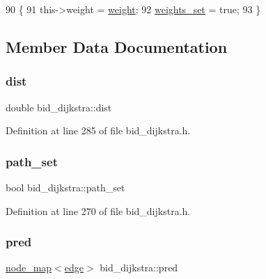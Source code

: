 \begin{DoxyCode}
90 \{
91     this->weight = \mbox{\hyperlink{classbid__dijkstra_a477c4f7ce631df84c832cb7d517cd243}{weight}};
92     \mbox{\hyperlink{classbid__dijkstra_a7636f90a27d14c9eb4b115e8dad05464}{weights\_set}} = \textcolor{keyword}{true};
93 \}
\end{DoxyCode}


\subsection{Member Data Documentation}
\mbox{\label{classbid__dijkstra_a10224bf2b56cb3fe20cef83592ecdc13}} 
\subsubsection{\texorpdfstring{dist}{dist}}
{\footnotesize\ttfamily double bid\+\_\+dijkstra\+::dist\hspace{0.3cm}{\ttfamily [private]}}



Definition at line 285 of file bid\+\_\+dijkstra.\+h.

\mbox{\label{classbid__dijkstra_aa7b329f69600fffae2753f87501dab9d}} 
\subsubsection{\texorpdfstring{path\+\_\+set}{path\_set}}
{\footnotesize\ttfamily bool bid\+\_\+dijkstra\+::path\+\_\+set\hspace{0.3cm}{\ttfamily [private]}}



Definition at line 270 of file bid\+\_\+dijkstra.\+h.

\mbox{\label{classbid__dijkstra_a930f24f8d17953eccfa0e8765587b0ea}} 
\subsubsection{\texorpdfstring{pred}{pred}}
{\footnotesize\ttfamily \mbox{\hyperlink{classnode__map}{node\+\_\+map}}$<$\mbox{\hyperlink{classedge}{edge}}$>$ bid\+\_\+dijkstra\+::pred\hspace{0.3cm}{\ttfamily [private]}}



